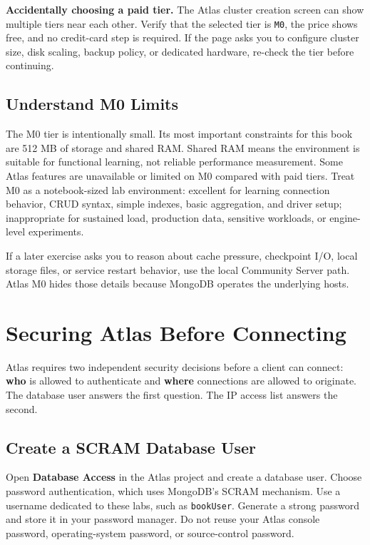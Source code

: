 \begin{pitfall}
\textbf{Accidentally choosing a paid tier.} The Atlas cluster creation screen can show multiple tiers near each other. Verify that the selected tier is \texttt{M0}, the price shows free, and no credit-card step is required. If the page asks you to configure cluster size, disk scaling, backup policy, or dedicated hardware, re-check the tier before continuing.
\end{pitfall}

\subsection{Understand M0 Limits}
The M0 tier is intentionally small. Its most important constraints for this book are 512 MB of storage and shared RAM. Shared RAM means the environment is suitable for functional learning, not reliable performance measurement. Some Atlas features are unavailable or limited on M0 compared with paid tiers. Treat M0 as a notebook-sized lab environment: excellent for learning connection behavior, CRUD syntax, simple indexes, basic aggregation, and driver setup; inappropriate for sustained load, production data, sensitive workloads, or engine-level experiments.

If a later exercise asks you to reason about cache pressure, checkpoint I/O, local storage files, or service restart behavior, use the local Community Server path. Atlas M0 hides those details because MongoDB operates the underlying hosts.

\section{Securing Atlas Before Connecting}
Atlas requires two independent security decisions before a client can connect: \textbf{who} is allowed to authenticate and \textbf{where} connections are allowed to originate. The database user answers the first question. The IP access list answers the second.

\subsection{Create a SCRAM Database User}
Open \textbf{Database Access} in the Atlas project and create a database user. Choose password authentication, which uses MongoDB's SCRAM mechanism. Use a username dedicated to these labs, such as \texttt{bookUser}. Generate a strong password and store it in your password manager. Do not reuse your Atlas console password, operating-system password, or source-control password.

